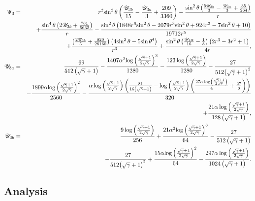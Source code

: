 \begin{eqnarray*}
\Psi_3 &=&
r^2 {\sin^2\theta} \left(\frac{{\mathscr{U}_{3b}}}{15} - \frac{{\mathscr{U}_{3a}}}{3} + \frac{209}{3360}\right) 
 - \frac{{\sin^2\theta} \left(\frac{5 {\mathscr{U}_{3b}}}{3} - \frac{{\mathscr{U}_{3a}}}{3} + \frac{35}{264}\right)}{r}
\\ && + \frac{{\sin^4\theta} \left(2 {\mathscr{U}_{3b}} + \frac{761}{5632}\right)}{r} - \frac{{\sin^2\theta} \left(1848 r^6 {\sin^2\theta} - 2079 r^3 {\sin^2\theta} + 924 r^3 - 7 {\sin^2\theta} + 10\right)}{19712 r^5} 
\\ && + \frac{\left(\frac{2 {\mathscr{U}_{3b}}}{5} + \frac{829}{28160}\right) \left(4 {\sin^2\theta} - 5 {\sin\theta}^4\right)}{r^3} + \frac{{\sin^2\theta} \left(\frac{{\mathscr{U}_1}\alpha}{16} - \frac{1}{8}\right) \left(2 r^3 - 3 r^2 + 1\right)}{4 r},
\\
\mathscr{U}_{3a} &=& \frac{69}{512 \left(\sqrt{\gamma} + 1\right)} - \frac{1407\alpha^2 {\log\left(\frac{\sqrt{\gamma} + 1}{2 \sqrt{\gamma}}\right)}^3}{1280} - \frac{123 \log\left(\frac{\sqrt{\gamma} + 1}{2 \sqrt{\gamma}}\right)}{1280} - \frac{27}{512 {\left(\sqrt{\gamma} + 1\right)}^2} \\ && -
\frac{1899\alpha {\log\left(\frac{\sqrt{\gamma} + 1}{2 \sqrt{\gamma}}\right)}^2}{2560} - \frac{\alpha \log\left(\frac{\sqrt{\gamma} + 1}{2 \sqrt{\gamma}}\right) \left(\frac{81}{16 \left(\sqrt{\gamma} + 1\right)} - \log\left(\frac{\sqrt{\gamma} + 1}{2 \sqrt{\gamma}}\right) \left(\frac{27\alpha \log\left(\frac{\sqrt{\gamma} + 1}{2 \sqrt{\gamma}}\right)}{4} + \frac{27}{8}\right)\right)}{320} \\ && + 
\frac{21\alpha \log\left(\frac{\sqrt{\gamma} + 1}{2 \sqrt{\gamma}}\right)}{128 \left(\sqrt{\gamma} + 1\right)},
\\
\mathscr{U}_{3b} &=& \frac{9 \log\left(\frac{\sqrt{\gamma} + 1}{2 \sqrt{\gamma}}\right)}{256} + \frac{21\alpha^2 {\log\left(\frac{\sqrt{\gamma} + 1}{2 \sqrt{\gamma}}\right)}^3}{64} - \frac{27}{512 \left(\sqrt{\gamma} + 1\right)} 
\\ && 
- \frac{27}{512 {\left(\sqrt{\gamma} + 1\right)}^2} + \frac{15\alpha {\log\left(\frac{\sqrt{\gamma} + 1}{2 \sqrt{\gamma}}\right)}^2}{64} 
- \frac{297\alpha \log\left(\frac{\sqrt{\gamma} + 1}{2 \sqrt{\gamma}}\right)}{1024 \left(\sqrt{\gamma} + 1\right)}.
\end{eqnarray*}

\subsection{Analysis}

